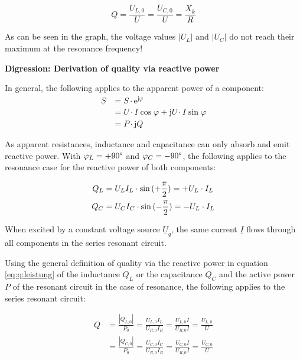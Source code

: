 \begin{frame}
{    \begin{equation}
        Q = \frac{U_{L,0}}{U} = \frac{U_{C,0}}{U} = \frac{X_k}{R}
    \end{equation}

    As can be seen in the graph, the voltage values $|U_L|$ and $|U_C|$ do not reach their maximum at the resonance frequency!

    \textbf{Digression: Derivation of quality via reactive power}

    In general, the following applies to the apparent power of a component:
    \begin{align}\label{eq:ql}\underline{S}
        &= S \cdot \mathrm{e}^{\mathrm{j}\varphi} \\
        &= U \cdot I \cos{\varphi} + \mathrm{j} U \cdot I \sin{\varphi} \\
        &= P \cdot \mathrm{j} Q
    \end{align}

    As apparent resistances, inductance and capacitance can only absorb and emit reactive power.
    With $\varphi_L = +90\degree$ and $\varphi_C = -90\degree$, the following applies to the resonance case for the reactive power of both components:

    \begin{equation}\label{eq:blindleistung:rlcs}
        \begin{aligned}
            Q_L &= U_L I_L \cdot \sin{(+\frac{\pi}{2})} = + U_L \cdot I_L \vphantom{\big|}\\
            Q_C &= U_C I_C \cdot \sin{(-\frac{\pi}{2})} = - U_L \cdot I_L \vphantom{\big|}
        \end{aligned}
    \end{equation}

    When excited by a constant voltage source $\underline{U}_q$, the same current $\underline{I}$ 
    flows through all components in the series resonant circuit.
    
    Using the general definition of quality via the reactive power in equation \ref{eq:q:leistung}
    of the inductance $Q_L$ or the capacitance $Q_C$ and the active power $P$ of the resonant circuit 
    in the case of resonance, the following applies to the series resonant circuit:

    \begin{equation}\label{eq:rlcs:q:guete}
        \begin{aligned}
            Q &= \frac{|Q_{L,0}|}{P_0} = \frac{U_{L,0}I_L}{U_{R,0}I_R} = \frac{U_{L,0}I}{U_{R,0}I} = \frac{U_{L,0}}{U}\\
            &= \frac{|Q_{C,0}|}{P_0} = \frac{U_{C,0}I_C}{U_{R,0}I_R} = \frac{U_{C,0}I}{U_{R,0}I} = \frac{U_{C,0}}{U}
        \end{aligned}
    \end{equation}

}
\end{frame}
